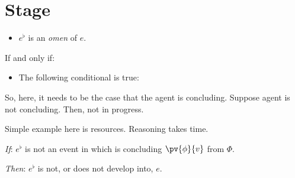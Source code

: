 \chapter{Stage}
\label{cha:stage}


\begin{note}
  \begin{definition}
    \begin{itemize}
    \item
      \(e^{\flat}\) is an \emph{omen} of \(e\).
    \end{itemize}
    If and only if:
    \begin{itemize}
    \item
      The following conditional is true:
    \end{itemize}
  \end{definition}

  So, here, it needs to be the case that the agent is concluding.
  Suppose agent is not concluding.
  Then, not in progress.

  

  Simple example here is resources.
  Reasoning takes time.


  \begin{itenum}
  \item[\emph{If}:]
    \(e^{\flat}\) is not an event in which \vAgent{} is concluding \(\pv{\phi}{v}\) from \(\Phi\).
  \item[\emph{Then}:]
    \(e^{\flat}\) is not, or does not develop into, \(e\).
  \end{itenum}


\end{note}


